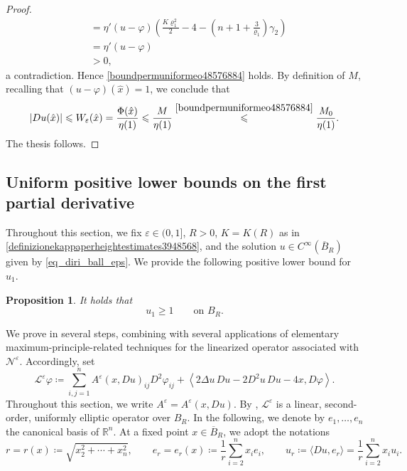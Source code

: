 \documentclass[11pt]{amsart}
\renewcommand{\leq}{\leqslant}
\renewcommand{\geq}{\geqslant}
\renewcommand{\ge}{>}
\newcommand{\rr}{{\mathbb{R}}}
\newcommand{\eps}{\varepsilon}
\newcommand{\We}{W_\eps}
\newcommand{\Ne}{\mathcal N^\eps}
\newcommand{\Le}{\mathcal L^\eps}
\newcommand{\Ae}{A^\eps}
\newtheorem{proposition}[theorem]{Proposition}
\theoremstyle{definition}
\theoremstyle{remark}
\numberwithin{equation}{section}
\begin{document}
\begin{proof}
\begin{equation*}
\begin{split}
          &=\eta'(u-\varphi)\left(\frac{K\varrho_1^2}{2}-4-\left(n+1+\frac{3}{\varrho_1}\right)\gamma_2\right)\\
          &=\eta'(u-\varphi)\\
          &\ge 0,
    \end{split}
    \end{equation*}
    a contradiction. Hence \eqref{boundpermuniformeo48576884} holds. By definition of $M$, recalling that $(u-\varphi)(\hat x)=1$, we conclude that
    \begin{equation*}
        |Du(\hat x)|\leq \We(\hat x)=\frac{\Phi(\hat x)}{\eta(1)}\leq \frac{M}{\eta(1)}\overset{\eqref{boundpermuniformeo48576884}}{\leq}\frac{M_0}{\eta(1)}.
    \end{equation*}
    The thesis follows. 
\end{proof}
\subsection{Uniform positive lower bounds on the first partial derivative}\label{fvrtg5ytbgtygvtr}
Throughout this section, we fix $\eps\in(0,1]$, $R\ge 0$, $K=K(R)$ as in \eqref{definizionekappaperheightestimates3948568}, and the solution $u\in C^\infty(\overline B_R)$ given by \eqref{eq_diri_ball_eps}. We provide the following positive lower bound for $u_1$. 
\begin{proposition}\label{prooffromboundtoboundderprop3848}
    It holds that 
    \begin{equation}\label{ugequnoonbrproop}
        u_1\geq 1 \qquad\text{on } B_R.
    \end{equation}
\end{proposition}
We prove   in several steps, combining  with several applications of elementary maximum-principle-related techniques for the linearized operator associated with $\Ne$. Accordingly, set
\begin{equation}\label{linearizeddef3845}
    \Le\varphi\coloneqq \sum_{i,j=1}^n\Ae(x,Du)_{ij}D^2\varphi_{ij}+\left\langle 2\Delta u\,Du-2D^2 u\,Du-4x,D\varphi\right\rangle.
\end{equation}
Throughout this section, we write  $\Ae=\Ae(x,Du)$. By , $\Le$ is a linear, second-order, uniformly elliptic operator over $ B_R$. In the following, we denote by $e_1,\ldots, e_n$ the canonical basis of $\rr^n$.  At a fixed point $x\in \overline B_R$, we adopt the notations
\begin{equation*}
    r=r(x)\coloneqq \sqrt{x_2^2+\cdots+x_n^2},\qquad e_r=e_r(x)\coloneqq\frac{1}{r}\sum_{i=2}^nx_i e_i,\qquad u_r\coloneqq \langle Du,e_r\rangle =\frac{1}{r}\sum_{i=2}^nx_i u_i.
\end{equation*}
\end{document}
